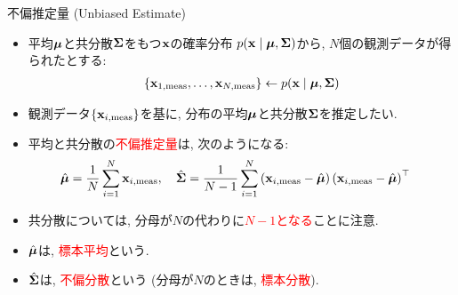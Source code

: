 \documentclass[dvipdfmx,notheorems,t]{beamer}
\begin{document}
\begin{frame}{不偏推定量 (Unbiased Estimate)}
\begin{itemize}
  \item 平均$\vb*{\mu}$と共分散$\vb{\Sigma}$をもつ$\vb{x}$の確率分布
  $p(\vb{x} \mid \vb*{\mu}, \vb{\Sigma})$から, $N$個の観測データが得られたとする:
  \begin{align*}
    \left\{ \vb{x}_{1, \mathrm{meas}}, \ldots, \vb{x}_{N, \mathrm{meas}} \right\}
      \gets p(\vb{x} \mid \vb*{\mu}, \vb{\Sigma})
  \end{align*}
  \item 観測データ$\{ \vb{x}_{i, \mathrm{meas}} \}$を基に,
  分布の平均$\vb*{\mu}$と共分散$\vb{\Sigma}$を推定したい.
  \item 平均と共分散の\textcolor{red}{不偏推定量}は, 次のようになる:
  \begin{align*}
    \hat{\vb*{\mu}} &= \frac{1}{N} \sum_{i = 1}^N \vb{x}_{i, \mathrm{meas}}, \quad
    \hat{\vb{\Sigma}} = \frac{1}{N - 1} \sum_{i = 1}^N
      \left( \vb{x}_{i, \mathrm{meas}} - \hat{\vb*{\mu}} \right)
      \left( \vb{x}_{i, \mathrm{meas}} - \hat{\vb*{\mu}} \right)^\top
  \end{align*}
  \item 共分散については, 分母が$N$の代わりに\textcolor{red}{$N - 1$となる}ことに注意.
  \item $\hat{\vb*{\mu}}$は, \textcolor{red}{標本平均}という.
  \item $\hat{\vb{\Sigma}}$は, \textcolor{red}{不偏分散}という (分母が$N$のときは, \textcolor{red}{標本分散}).
\end{itemize}
\end{frame}
\end{document}
